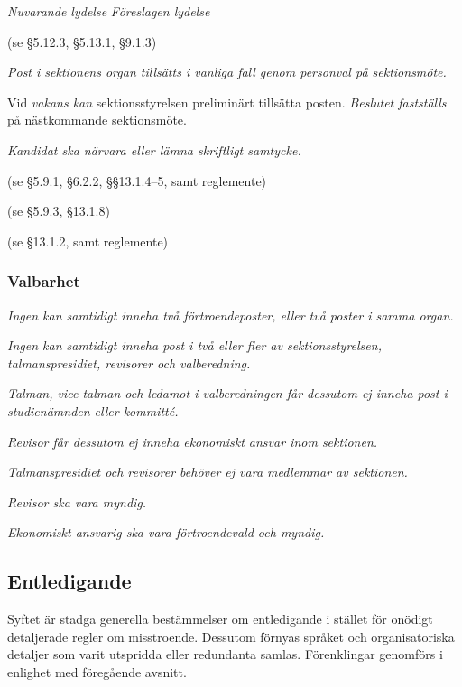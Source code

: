\documentclass{article}
\newenvironment{lydelse}
    {\begin{paracol}{2}%
        \emph{Nuvarande lydelse}%
        \switchcolumn%
        \emph{Föreslagen lydelse}%
    \end{paracol}%
    \begin{enumerate}[label=\thesubsection.\arabic*]%
    \begin{paracol}{2}%
    }{\end{paracol}\end{enumerate}}
\begin{document}
\begin{lydelse}
    (se \S 5.12.3, \S 5.13.1, \S 9.1.3)
  \switchcolumn
    \item \emph{Post i sektionens organ tillsätts i vanliga fall genom personval på sektionsmöte.} \label{4.x:tillsätt}

    \item Vid \emph{vakans kan} sektionsstyrelsen preliminärt tillsätta posten.
      \emph{Beslutet fastställs} på nästkommande sektionsmöte. \label{4.x:styretval}

    \item \emph{Kandidat ska närvara eller lämna skriftligt samtycke.} \label{4.x:samtycke}

  \switchcolumn*
    \item[] (se \S 5.9.1, \S 6.2.2, \S\S 13.1.4--5, samt reglemente)
    \item[] (se \S 5.9.3, \S 13.1.8)
    \item[] (se \S 13.1.2, samt reglemente)
    \switchcolumn  
    \subsubsection*{Valbarhet}
    \item \emph{Ingen kan samtidigt inneha två förtroendeposter, eller två poster i samma organ.}

    \item \emph{Ingen kan samtidigt inneha post i två eller fler av sektionsstyrelsen, talmanspresidiet, revisorer och valberedning.} \label{4.x:valbar.dubbel}

    \item \emph{Talman, vice talman och ledamot i valberedningen får dessutom ej inneha post i studienämnden eller kommitté.} \label{4.x:valbar.ober}

    \item \emph{Revisor får dessutom ej inneha ekonomiskt ansvar inom sektionen.}
      
    \item \emph{Talmanspresidiet och revisorer behöver ej vara medlemmar av sektionen.}

    \item \emph{Revisor ska vara myndig.} \label{4.x:valbar.revisormyndig}
      
    \item \emph{Ekonomiskt ansvarig ska vara förtroendevald och myndig.}
\end{lydelse}

\subsection{Entledigande}
Syftet är stadga generella bestämmelser om entledigande i stället för onödigt detaljerade regler om misstroende.
Dessutom förnyas språket och organisatoriska detaljer som varit utspridda eller redundanta samlas.
Förenklingar genomförs i enlighet med föregående avsnitt.
\end{document}
